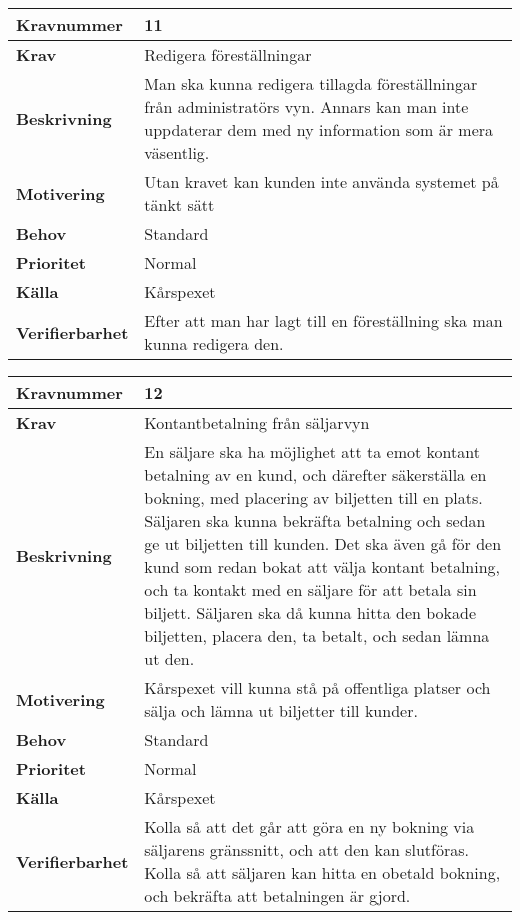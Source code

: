 \documentclass[a4paper, twoside, 11pt, titlepage]{article}
\begin{document}
\begin{tabular} { | p{3cm} | p{12.2cm} | }
	\hline
	\textbf{Kravnummer} & 11  \\
	\hline
	\textbf{Krav} & Redigera föreställningar  \\
	\hline
	\textbf{Beskrivning} & Man ska kunna redigera tillagda föreställningar från administratörs vyn. Annars kan man inte uppdaterar dem med ny information som är mera väsentlig.   \\
	\hline
	\textbf{Motivering} & Utan kravet kan kunden inte använda systemet på tänkt sätt  \\
	\hline
	\textbf{Behov} & Standard  \\
	\hline
	\textbf{Prioritet} & Normal  \\
	\hline
	\textbf{Källa} & Kårspexet  \\
	\hline
	\textbf{Verifierbarhet} & Efter att man har lagt till en föreställning ska man kunna redigera den.   \\
	\hline
\end{tabular}

\begin{tabular} { | p{3cm} | p{12.2cm} | }
	\hline
	\textbf{Kravnummer} & 12  \\
	\hline
	\textbf{Krav} & Kontantbetalning från säljarvyn  \\
	\hline
	\textbf{Beskrivning} & En säljare ska ha möjlighet att ta emot kontant betalning av en kund, och därefter säkerställa en bokning, med placering av biljetten till en plats. Säljaren ska kunna bekräfta betalning och sedan ge ut biljetten till kunden. Det ska även gå för den kund som redan bokat att välja kontant betalning, och ta kontakt med en säljare för att betala sin biljett. Säljaren ska då kunna hitta den bokade biljetten, placera den, ta betalt, och sedan lämna ut den.  \\
	\hline
	\textbf{Motivering} & Kårspexet vill kunna stå på offentliga platser och sälja och lämna ut biljetter till kunder.  \\
	\hline
	\textbf{Behov} & Standard  \\
	\hline
	\textbf{Prioritet} & Normal  \\
	\hline
	\textbf{Källa} & Kårspexet  \\
	\hline
	\textbf{Verifierbarhet} & Kolla så att det går att göra en ny bokning via säljarens gränssnitt, och att den kan slutföras. Kolla så att säljaren kan hitta en obetald bokning, och bekräfta att betalningen är gjord.  \\
	\hline
\end{tabular}
\end{document}
